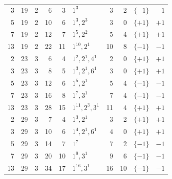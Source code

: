 \begin{longtable}{rrrrrlrrcc}
3 & 19 & 2 & 6 & 3 & $1^{3}$ & 3 & 2 & $\{-1\}$ & $-1$\\
5 & 19 & 2 & 10 & 6 & $1^{3}, 2^{3}$ & 3 & 0 & $\{+1\}$ & $+1$\\
7 & 19 & 2 & 12 & 7 & $1^{5}, 2^{2}$ & 5 & 4 & $\{+1\}$ & $+1$\\
13 & 19 & 2 & 22 & 11 & $1^{10}, 2^{1}$ & 10 & 8 & $\{-1\}$ & $-1$\\
2 & 23 & 3 & 6 & 4 & $1^{2}, 2^{1}, 4^{1}$ & 2 & 0 & $\{+1\}$ & $+1$\\
3 & 23 & 3 & 8 & 5 & $1^{3}, 2^{1}, 6^{1}$ & 3 & 0 & $\{+1\}$ & $+1$\\
5 & 23 & 3 & 12 & 6 & $1^{5}, 2^{1}$ & 5 & 4 & $\{-1\}$ & $-1$\\
7 & 23 & 3 & 16 & 8 & $1^{7}, 3^{1}$ & 7 & 4 & $\{-1\}$ & $-1$\\
13 & 23 & 3 & 28 & 15 & $1^{11}, 2^{3}, 3^{1}$ & 11 & 4 & $\{+1\}$ & $+1$\\
2 & 29 & 3 & 7 & 4 & $1^{3}, 2^{1}$ & 3 & 2 & $\{+1\}$ & $+1$\\
3 & 29 & 3 & 10 & 6 & $1^{4}, 2^{1}, 6^{1}$ & 4 & 0 & $\{+1\}$ & $+1$\\
5 & 29 & 3 & 14 & 7 & $1^{7}$ & 7 & 2 & $\{-1\}$ & $-1$\\
7 & 29 & 3 & 20 & 10 & $1^{9}, 3^{1}$ & 9 & 6 & $\{-1\}$ & $-1$\\
13 & 29 & 3 & 34 & 17 & $1^{16}, 3^{1}$ & 16 & 10 & $\{-1\}$ & $-1$\\
\bottomrule
\end{longtable}
